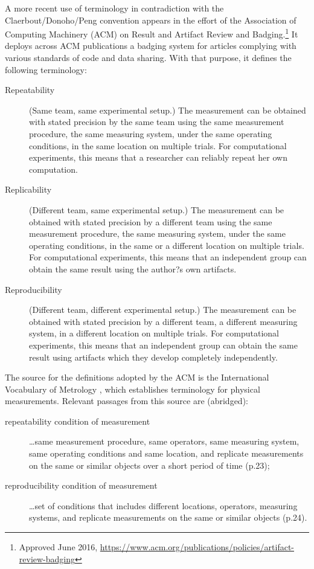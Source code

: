 \documentclass{statement}
\newlength{\up}
\begin{document}
A more recent use of terminology in contradiction with the Claerbout/Donoho/Peng convention appears in the effort of the Association of Computing Machinery (ACM) on Result and Artifact Review and Badging.\footnote{ Approved June 2016, \url{https://www.acm.org/publications/policies/artifact-review-badging}}  It deploys across ACM publications a badging system for articles complying with various standards of code and data sharing. With that purpose, it defines the following terminology:
%
\begin{description}
\item[Repeatability ]  (Same team, same experimental setup.)
The measurement can be obtained with stated precision by the same team using the same measurement procedure, the same measuring system, under the same operating conditions, in the same location on multiple trials. For computational experiments, this means that a researcher can reliably repeat her own computation.
\item[Replicability ] (Different team, same experimental setup.)
The measurement can be obtained with stated precision by a different team using the same measurement procedure, the same measuring system, under the same operating conditions, in the same or a different location on multiple trials. For computational experiments, this means that an independent group can obtain the same result using the author?s own artifacts.
\item[Reproducibility] (Different team, different experimental setup.)
The measurement can be obtained with stated precision by a different team, a different measuring system, in a different location on multiple trials. For computational experiments, this means that an independent group can obtain the same result using artifacts which they develop completely independently.
\end{description}


The source for the definitions adopted by the ACM is the International Vocabulary of Metrology \cite[]{jcgm2008}, which establishes terminology for physical measurements. 
Relevant passages from this source are (abridged):
\begin{description}
\item[repeatability condition of measurement]\ldots same measurement procedure, same operators, same measuring system, same operating conditions and same location, and replicate measurements on the same or similar objects over a short period of time (p.23);
\item[reproducibility condition of measurement]\ldots set of conditions that includes different locations, operators, measuring systems, and replicate measurements on the same or similar objects (p.24).
\end{description}
\end{document}
